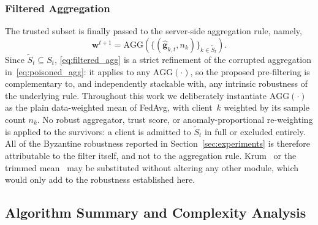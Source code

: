 \documentclass[journal]{IEEEtran}
\begin{document}
\subsubsection{Filtered Aggregation}
The trusted subset is finally passed to the server-side aggregation rule, namely,
\begin{equation}
\mathbf{w}^{t+1} = \text{AGG}\!\left(\{(\hat{\mathbf{g}}_{k,t}, n_k)\}_{k \in \widetilde{S}_t}\right).
\label{eq:filtered_agg}
\end{equation}
Since $\widetilde{S}_t \subseteq S_t$, \eqref{eq:filtered_agg} is a strict refinement of the corrupted aggregation in~\eqref{eq:poisoned_agg}: it applies to any $\text{AGG}(\cdot)$, so the proposed pre-filtering is complementary to, and independently stackable with, any intrinsic robustness of the underlying rule. Throughout this work we deliberately instantiate $\text{AGG}(\cdot)$ as the plain data-weighted mean of FedAvg, with client~$k$ weighted by its sample count $n_k$. No robust aggregator, trust score, or anomaly-proportional re-weighting is applied to the survivors: a client is admitted to $\widetilde{S}_t$ in full or excluded entirely. All of the Byzantine robustness reported in Section~\ref{sec:experiments} is therefore attributable to the filter itself, and not to the aggregation rule. Krum~\cite{blanchard2017machine} or the trimmed mean~\cite{yin2018byzantine} may be substituted without altering any other module, which would only add to the robustness established here.

\subsection{Algorithm Summary and Complexity Analysis}
\label{sec:complexity}
\end{document}
